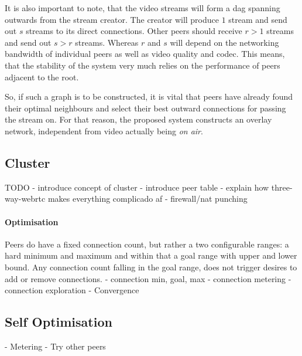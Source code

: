 It is also important to note, that the video streams will form a \gls{dag} spanning outwards from the stream creator. The creator will produce $1$ stream and send out $s$ streams to its direct connections. Other peers should receive $r > 1$ streams and send out $s > r$ streams. Whereas $r$ and $s$ will depend on the networking bandwidth of individual peers as well as video quality and codec. This means, that the stability of the system very much relies on the performance of peers adjacent to the root.

So, if such a graph is to be constructed, it is vital that peers have already found their optimal neighbours and select their best outward connections for passing the stream on. For that reason, the proposed system constructs an overlay network, independent from video actually being \textit{on air}.

\subsection{Cluster}
TODO
- introduce concept of cluster
- introduce peer table
- explain how three-way-webrtc makes everything complicado af
    - firewall/nat punching

\paragraph{Optimisation}
Peers do have a fixed connection count, but rather a two configurable ranges: a hard minimum and maximum and within that a goal range with upper and lower bound. Any connection count falling in the goal range, does not trigger desires to add or remove connections.
- connection min, goal, max
- connection metering
- connection exploration
- Convergence

\subsection{Self Optimisation}
- Metering
- Try other peers
